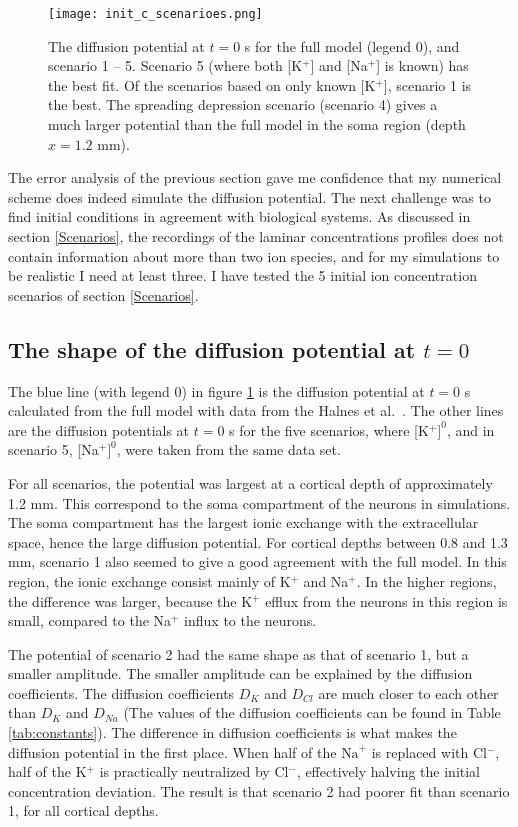 \documentclass{uiophd}
\begin{document}
\begin{figure}
  \centering
  \texttt{[image: init\_c\_scenarioes.png]}
  \caption{The diffusion potential at $t=0$ s for the full model (legend 0), and scenario 1 -- 5. Scenario 5 (where both [K$^+$] and [Na$^+$] is known) has the best fit. Of the scenarios based on only known [K$^+$], scenario 1 is the best. The spreading depression scenario (scenario 4) gives a much larger potential than the full model in the soma region (depth $x=1.2$ mm). }
  \label{fig:init_c_scenarioes}
\end{figure}
The error analysis of the previous section gave me confidence that my numerical scheme does indeed simulate the diffusion potential. The next challenge was to find initial conditions in agreement with biological systems. As discussed in section \ref{Scenarios}, the recordings of the laminar concentrations profiles does not contain information about more than two ion species, and for my simulations to be realistic I need at least three. I have tested the 5 initial ion concentration scenarios of section \ref{Scenarios}. 

\subsection{The shape of the diffusion potential at $t=0$}

The blue line (with legend 0) in figure \ref{fig:init_c_scenarioes} is the diffusion potential at $t=0$ s calculated from the full model with data from the Halnes et al.~\cite{Halnes2016}. The other lines are the diffusion potentials at $t=0$ s for the five scenarios, where [K$^+]^0$, and in scenario 5, [Na$^+]^0$, were taken from the same data set.  

For all scenarios, the potential was largest at a cortical depth of approximately 1.2 mm. This correspond to the soma compartment of the neurons in simulations. The soma compartment has the largest ionic exchange with the extracellular space, hence the large diffusion potential. For cortical depths between 0.8 and 1.3 mm, scenario 1 also seemed to give a good agreement with the full model. In this region, the ionic exchange consist mainly of K$^+$ and Na$^+$. In the higher regions, the difference was larger, because the K$^+$ efflux from the neurons in this region is small, compared to the Na$^+$ influx to the neurons.

The potential of scenario 2 had the same shape as that of scenario 1, but a smaller amplitude. The smaller amplitude can be explained by the diffusion coefficients. The diffusion coefficients $D_K$ and $D_{Cl}$ are much closer to each other than $D_K$ and $D_{Na}$ (The values of the diffusion coefficients can be found in Table \ref{tab:constants}).  The difference in diffusion coefficients is what makes the diffusion potential in the first place. When half of the $\text{Na}^+ $ is replaced with Cl$^-$, half of the K$^+$ is practically neutralized by Cl$^-$, effectively halving the initial concentration deviation. The result is that scenario 2 had poorer fit than scenario 1, for all cortical depths. 
\end{document}
